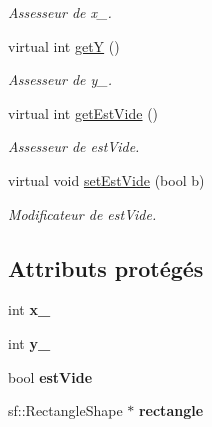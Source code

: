 \begin{DoxyCompactItemize}
\begin{DoxyCompactList}\small\item\em \-Assesseur de x\-\_\-. \end{DoxyCompactList}\item 
virtual int \hyperlink{classCase_a824f612c5a660a1d55ac06931747c46d}{get\-Y} ()
\begin{DoxyCompactList}\small\item\em \-Assesseur de y\-\_\-. \end{DoxyCompactList}\item 
virtual int \hyperlink{classCase_a80ae0e9d1a9c575bee4c8a7b984deb59}{get\-Est\-Vide} ()
\begin{DoxyCompactList}\small\item\em \-Assesseur de est\-Vide. \end{DoxyCompactList}\item 
\hypertarget{classCase_a292e07394ff0a1c31ebf35940c91f29d}{virtual void \hyperlink{classCase_a292e07394ff0a1c31ebf35940c91f29d}{set\-Est\-Vide} (bool b)}\label{classCase_a292e07394ff0a1c31ebf35940c91f29d}

\begin{DoxyCompactList}\small\item\em \-Modificateur de est\-Vide. \end{DoxyCompactList}\end{DoxyCompactItemize}
\subsection*{\-Attributs protégés}
\begin{DoxyCompactItemize}
\item 
\hypertarget{classCase_a45ecd9780447322263846abde6b5dfb8}{int {\bfseries x\-\_\-}}\label{classCase_a45ecd9780447322263846abde6b5dfb8}

\item 
\hypertarget{classCase_a44d580d307f1bacd6e68fc1384afc296}{int {\bfseries y\-\_\-}}\label{classCase_a44d580d307f1bacd6e68fc1384afc296}

\item 
\hypertarget{classCase_a8a42e3989f79ab7f95635d59e7c20ba5}{bool {\bfseries est\-Vide}}\label{classCase_a8a42e3989f79ab7f95635d59e7c20ba5}

\item 
\hypertarget{classCase_a09b40766357ec483aa249103c35eaf81}{sf\-::\-Rectangle\-Shape $\ast$ {\bfseries rectangle}}\label{classCase_a09b40766357ec483aa249103c35eaf81}

\end{DoxyCompactItemize}
